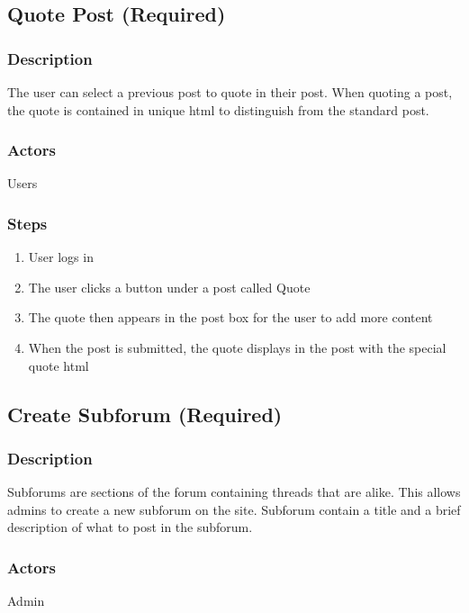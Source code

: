 \documentclass[12pt]{scrartcl}
\begin{document}
\subsection{Quote Post (Required)}
\subsubsection{Description}

The user can select a previous post to quote in their post. When quoting a post, the quote is contained in unique html to distinguish from the standard post. 
\subsubsection{Actors}

Users

\subsubsection{Steps}

\begin{enumerate}
\item User logs in
\item The user clicks a button under a post called Quote
\item The quote then appears in the post box for the user to add more content
\item When the post is submitted, the quote displays in the post with the special quote html
\end{enumerate}

\subsection{Create Subforum (Required)}
\subsubsection{Description}
Subforums are sections of the forum containing threads that are alike. This allows admins to create a new subforum on the site. Subforum contain a title and a brief description of what to post in the subforum.

\subsubsection{Actors}

Admin
\end{document}
